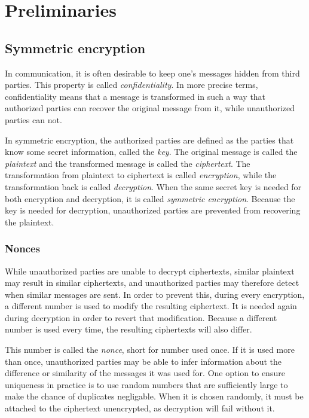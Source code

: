 \section{Preliminaries}

\subsection{Symmetric encryption}

In communication, it is often desirable to keep one's messages hidden from third
parties. This property is called \emph{confidentiality}. In more precise terms,
confidentiality means that a message is transformed in such a way that
authorized parties can recover the original message from it, while unauthorized
parties can not.

In symmetric encryption, the authorized parties are defined as
the parties that know some secret information, called the \emph{key}. The
original message is called the \emph{plaintext} and the transformed message is
called the \emph{ciphertext}. The transformation from plaintext to ciphertext is
called \emph{encryption}, while the transformation back is called
\emph{decryption}. When the same secret key is needed for both encryption and
decryption, it is called \emph{symmetric encryption}. Because the key is needed
for decryption, unauthorized parties are prevented from recovering the
plaintext.

\subsubsection{Nonces}

While unauthorized parties are unable to decrypt ciphertexts, similar plaintext
may result in similar ciphertexts, and unauthorized parties may therefore detect
when similar messages are sent. In order to prevent this, during every
encryption, a different number is used to modify the resulting ciphertext. It is
needed again during decryption in order to revert that modification. Because a
different number is used every time, the resulting ciphertexts will also differ.

This number is called the \emph{nonce}, short for number used once. If it is
used more than once, unauthorized parties may be able to infer information about
the difference or similarity of the messages it was used for. One option to
ensure uniqueness in practice is to use random numbers that are sufficiently
large to make the chance of duplicates negligable. When it is chosen randomly,
it must be attached to the ciphertext unencrypted, as decryption will fail
without it.

